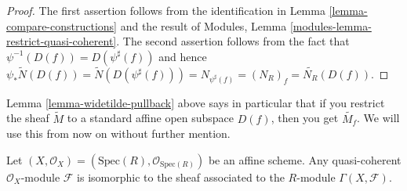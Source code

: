 \begin{proof}
The first assertion follows from the identification in
Lemma \ref{lemma-compare-constructions}
and the result of Modules, Lemma \ref{modules-lemma-restrict-quasi-coherent}.
The second assertion follows from the fact
that $\psi^{-1}(D(f)) = D(\psi^\sharp(f))$ and hence
$\psi_* \widetilde N(D(f)) = \widetilde N(D(\psi^\sharp(f))) = 
N_{\psi^\sharp(f)} = (N_R)_f = \widetilde{N_R}(D(f))$.
\end{proof}

\noindent
Lemma \ref{lemma-widetilde-pullback} above says in particular
that if you restrict
the sheaf $\widetilde M$ to a standard affine open subspace
$D(f)$, then you get $\widetilde{M_f}$. We will use this from
now on without further mention.

\begin{lemma}
\label{lemma-quasi-coherent-affine}
Let $(X, \mathcal{O}_X) = (\text{Spec}(R), \mathcal{O}_{\text{Spec}(R)})$
be an affine scheme.
Any quasi-coherent $\mathcal{O}_X$-module
$\mathcal{F}$ is isomorphic to the sheaf associated to
the $R$-module $\Gamma(X, \mathcal{F})$.
\end{lemma}

